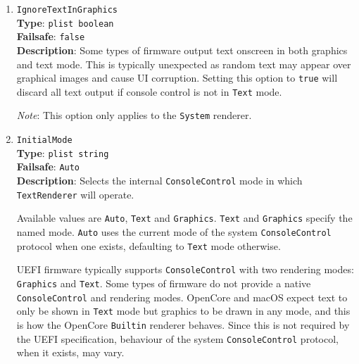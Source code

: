 \documentclass[]{article}
\providecommand{\tightlist}{%
  \setlength{\itemsep}{0pt}\setlength{\parskip}{0pt}}
\begin{document}
\begin{enumerate}
  \begin{itemize}
    \tightlist
    \item \texttt{Enabled} --- provide GOP for all UGA protocols.
    \item \texttt{Apple} --- provide GOP for \texttt{AppleFramebufferInfo}-enabled protocols.
    \item \texttt{Disabled} --- do not provide GOP.
  \end{itemize}

  \emph{Note}: This option requires \texttt{ProvideConsoleGop} to be enabled.

\item
  \texttt{IgnoreTextInGraphics}\\
  \textbf{Type}: \texttt{plist\ boolean}\\
  \textbf{Failsafe}: \texttt{false}\\
  \textbf{Description}: Some types of firmware output text onscreen in both graphics and
  text mode. This is typically unexpected as random text may appear over
  graphical images and cause UI corruption. Setting this option to \texttt{true} will
  discard all text output if console control is not in \texttt{Text} mode.

  \emph{Note}: This option only applies to the \texttt{System} renderer.

\item
  \texttt{InitialMode}\\
  \textbf{Type}: \texttt{plist\ string}\\
  \textbf{Failsafe}: \texttt{Auto}\\
  \textbf{Description}: Selects the internal \texttt{ConsoleControl} mode in
  which \texttt{TextRenderer} will operate.

  Available values are \texttt{Auto}, \texttt{Text} and \texttt{Graphics}.
  \texttt{Text} and \texttt{Graphics} specify the named mode. \texttt{Auto}
  uses the current mode of the system \texttt{ConsoleControl} protocol when
  one exists, defaulting to \texttt{Text} mode otherwise.

  UEFI firmware typically supports \texttt{ConsoleControl} with two
  rendering modes: \texttt{Graphics} and \texttt{Text}. Some types of firmware
  do not provide a native \texttt{ConsoleControl} and rendering modes. OpenCore
  and macOS expect text to only be shown in \texttt{Text} mode but
  graphics to be drawn in any mode, and this is how the OpenCore \texttt{Builtin}
  renderer behaves. Since this is not required by the UEFI specification, behaviour
  of the system \texttt{ConsoleControl} protocol, when it exists, may vary.


\end{enumerate}
\end{document}
